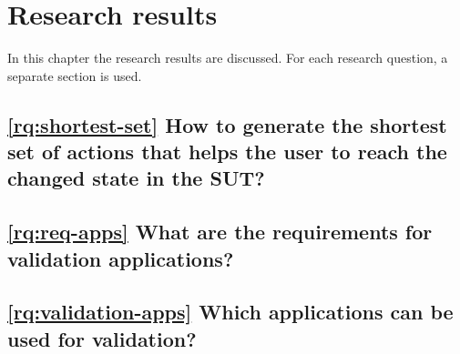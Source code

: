 \chapter{Research results}

In this chapter the research results are discussed.
For each research question, a separate section is used. 









\section{\ref{rq:shortest-set} How to generate the shortest set of actions that helps the user to reach the changed state in the SUT?}


\section{\ref{rq:req-apps} What are the requirements for validation applications?}


\section{\ref{rq:validation-apps} Which applications can be used for validation?}


